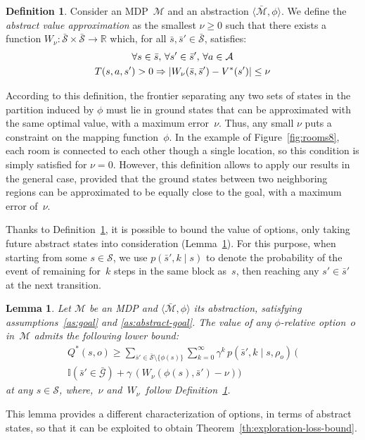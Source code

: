 \documentclass[letterpaper]{article} %
\theoremstyle{plain}
\newtheorem{lemma}{Lemma}
\theoremstyle{definition}
\newtheorem{definition}{Definition}
\theoremstyle{remark}
\DeclarePairedDelimiter{\abs}{\lvert}{\rvert}
\newcommand{\Reals}{\mathbb{R}}
\newcommand{\Given}{\mid}
\newcommand{\Indicator}{\mathbb{I}}
\renewcommand{\implies}{\Rightarrow}
\renewcommand{\implies}{\Rightarrow}
\newcommand{\SetSym}[1]{\mathcal{#1}}
\newcommand{\Policy}{\rho}
\newcommand{\States}{\SetSym{S}}
\newcommand{\Actions}{\SetSym{A}}
\newcommand{\Model}{\SetSym{M}}
\newcommand{\Mapping}{\phi}
\newcommand{\Abst}[1]{\bar{#1}}
\newcommand{\Goals}{\SetSym{G}}
\newcommand{\FromBlockTo}[3]{{#3}, {#2}}
\newcommand{\PHomogeneity}{\nu}
\begin{document}
\begin{definition}
	Consider an MDP~$\Model$ and an abstraction $\langle \Abst\Model, \Mapping \rangle$.
	We define the \emph{abstract value approximation} as the smallest $\PHomogeneity \ge 0$ such that
	there exists a function $W_{\PHomogeneity}: {\Abst\States \times \Abst\States \to \Reals}$
	which, for all $\Abst{s}, \Abst{s}' \in \Abst\States$, satisfies:
	\begin{multline}
		\forall s \in \Abst{s},\, \forall s' \in \Abst{s}',\, \forall a \in \Actions\\
		T(s, a, s') > 0 \implies  \abs{W_\PHomogeneity(\Abst{s}, \Abst{s}') - V^*(s')} \le \PHomogeneity
		\label{eq:equipotentials}
	\end{multline}
	\label{def:equipotentials}
\end{definition}
According to this definition, the frontier separating any two sets of states in the partition induced by $\Mapping$
must lie in ground states that can be approximated with the same optimal value, with a maximum error~$\PHomogeneity$.
Thus, any small $\PHomogeneity$ puts a constraint on the mapping function~$\Mapping$.
%
In the example of Figure~\ref{fig:rooms8}, each room is connected to each other though a single location, so this condition is simply satisfied for $\PHomogeneity = 0$.
However, this definition allows to apply our results in the general case,
provided that the ground states between two neighboring regions can be approximated to be equally close to the goal, with a maximum error of~$\PHomogeneity$.

Thanks to Definition~\ref{def:equipotentials}, it is possible to bound the value of options, only taking future abstract states into consideration (Lemma~\ref{lem:marginalized-optq}).
For this purpose, when starting from some \mbox{$s \in \States$},
we use $p(\FromBlockTo{s}{k}{\Abst{s}'} \Given s)$ to denote the probability of the event of remaining for~$k$ steps in the same block as~$s$,
then reaching any \mbox{$s' \in \Abst{s}'$} at the next transition.
\begin{lemma}
	Let $\Model$ be an MDP and $\langle \Abst{\Model}, \Mapping \rangle$ its abstraction, satisfying assumptions~\ref{as:goal} and \ref{as:abstract-goal}.
	The value of any $\Mapping$-relative option~$o$ in~$\Model$ admits the following lower bound:
	\begin{multline}
		Q^*(s, o) \ge
			\sum_{\Abst{s}' \in \Abst\States \setminus \{\Mapping(s)\}} \sum_{k=0}^{\infty}
					\gamma^k\, p(\FromBlockTo{s}{k}{\Abst{s}'} \Given s, \Policy_{o})\,
					\bigl(\\
			\Indicator(\Abst{s}' \in \Abst{\Goals}) + \gamma\, (W_\PHomogeneity(\Mapping(s), \Abst{s}') - \PHomogeneity) \bigr)
	\end{multline}
	at any $s \in \States$, where,~$\PHomogeneity$ and~$W_\PHomogeneity$\, follow Definition~\ref{def:equipotentials}.
	\label{lem:marginalized-optq}
\end{lemma}
This lemma provides a different characterization of options, in terms of abstract states, so that it can be exploited to obtain Theorem~\ref{th:exploration-loss-bound}.
\end{document}

